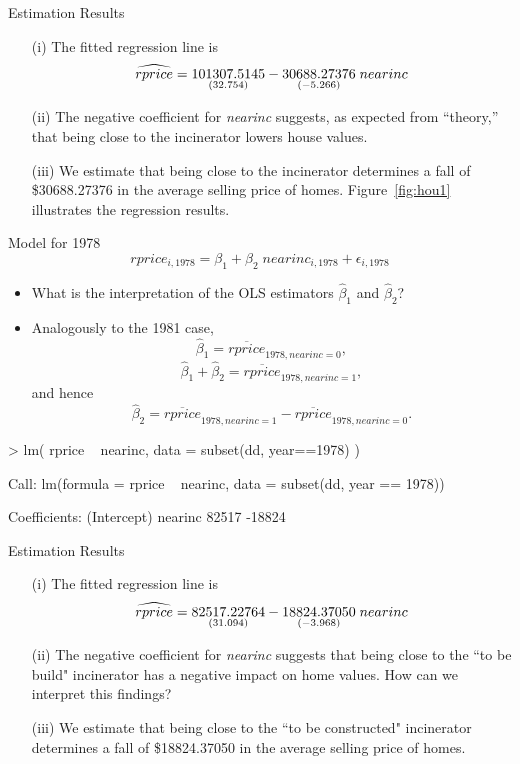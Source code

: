 \documentclass[landscape,letterpaper,9pt]{article}
\begin{document}
\newpage
Estimation Results
\begin{enumerate}
\item[(i)] The fitted regression line is
\[\widehat{rprice} = \us{101307.5145}{32.754} - \us{30688.27376}{-5.266}\; nearinc \]
\item[(ii)] The negative coefficient for \emph{nearinc} suggests, as
expected from  ``theory,'' that being close to the incinerator lowers house values.
\item[(iii)] We estimate that being close to the incinerator  determines a fall of
\$30688.27376 in the average selling price of homes. Figure~\ref{fig:hou1} illustrates the regression results.

%

\end{enumerate}

\newpage
Model for 1978
\[ rprice_{i,1978} = \beta_1 + \beta_2 \;  nearinc_{i,1978} + \epsilon_{i,1978} \]

\begin{itemize}
\item What is the interpretation of the OLS estimators \(\widehat{\beta}_1\) and \(\widehat{\beta}_2\)?
\item Analogously to the 1981 case,
\[\widehat{\beta}_1 = \overline{rprice}_{1978,nearinc=0},\]
\[\widehat{\beta}_1 + \widehat{\beta}_2 = \overline{rprice}_{1978,nearinc=1},\]
and hence
\[\widehat{\beta}_2 = \overline{rprice}_{1978,nearinc=1} - \overline{rprice}_{1978,nearinc=0}.\]
\end{itemize}

\begin{CVerbatim}
> lm( rprice ~ nearinc, data = subset(dd, year==1978) )

Call:
lm(formula = rprice ~ nearinc, data = subset(dd, year == 1978))

Coefficients:
(Intercept)      nearinc
      82517       -18824
\end{CVerbatim}

\newpage
Estimation Results
\begin{enumerate}
\item[(i)] The fitted regression line is
\[\widehat{rprice} = \us{82517.22764}{31.094} - \us{18824.37050}{-3.968 }\; nearinc \]
\item[(ii)] The negative coefficient for \emph{nearinc} suggests that being close to the
``to be build" incinerator has a negative impact
on home values. How can we interpret this findings?
\item[(iii)] We estimate that being close to the ``to be constructed" incinerator  determines a fall of
\$18824.37050 in the average selling price of homes.


\end{enumerate}
\newpage
\end{document}
